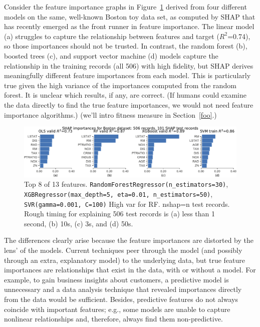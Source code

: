\documentclass[12pt]{article}
\newcommand{\secref}[1]{Section~\ref{#1}}
\newcommand{\figref}[1]{Figure~\ref{#1}}
\newcommand{\todo}[1]{{{\color{red}{[#1]}}}}
\begin{document}
Consider the feature importance graphs in \figref{fig:diff-models} derived from four different models on the same, well-known Boston toy data set, as computed by SHAP \cite{shap} that has recently emerged as the front runner in feature importance. The linear model (a) struggles to capture the relationship between features and target ($R^2$=0.74), so those importances should not be trusted.  In contrast, the random forest (b), boosted trees (c), and support vector machine (d) models capture the relationship in the training records (all 506) with high fidelity, but SHAP derives meaningfully different feature importances from each model.  This is particularly true given the high variance of the importances computed from the random forest. \todo{explain that} It is unclear which results, if any, are correct. (If humans could examine the data directly to find the true feature importances, we would not need feature importance algorithms.) (we'll intro fitness measure in \secref{foo}.)

\begin{figure}[htbp]
\begin{center}
\includegraphics[scale=0.6]{images/diff-models.pdf}
\caption{Top 8 of 13 features. {\tt\footnotesize RandomForestRegressor(n\_estimators=30)}, {\tt\footnotesize XGBRegressor(max\_depth=5, eta=0.01, n\_estimators=50)}, {\tt\footnotesize SVR(gamma=0.001, C=100)} High var for RF. nshap=n test records. Rough timing for explaining 506 test records is (a) less than 1 second, (b) 10s, (c) 3s, and (d) 50s.}
\label{fig:diff-models}
\end{center}
\end{figure}

The differences clearly arise because the feature importances are distorted by the lens' of the models. Current techniques peer through the model (and possibly through an extra, explanatory model) to the underlying data, but true feature importances are relationships that exist in the data, with or without a model.  For example, to gain business insights about customers, a predictive model is unnecessary and a data analysis technique that revealed importances directly from the data would be sufficient. \todo{maybe say PCA does this although limited to linear features and assumes most spread = most important?} Besides, predictive features do not always coincide with important features; e.g., some models are unable to capture nonlinear relationships and, therefore, always find them non-predictive.  \todo{last bit redundant?}
 
\end{document}
